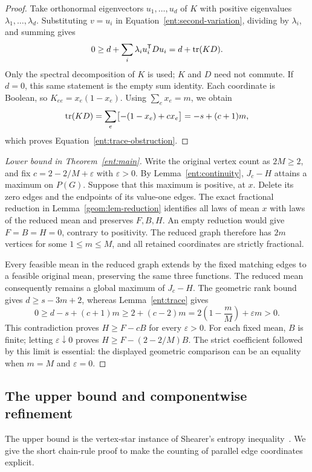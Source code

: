 \begin{proof}
Take orthonormal eigenvectors $u_1,\ldots,u_d$ of $K$ with positive
eigenvalues $\lambda_1,\ldots,\lambda_d$. Substituting $v=u_i$ in
Equation~\eqref{ent:second-variation}, dividing by $\lambda_i$, and
summing gives
\[
             0\ge d+\sum_i\lambda_i u_i^{\mathsf T}Du_i
                    =d+\operatorname{tr}(KD).
\]
Only the spectral decomposition of $K$ is used; $K$ and $D$ need not
commute. If $d=0$, this same statement is the empty sum identity.
Each coordinate is Boolean, so $K_{ee}=x_e(1-x_e)$. Using
$\sum_e x_e=m$, we obtain
\[
 \operatorname{tr}(KD)=\sum_e\bigl[-(1-x_e)+cx_e\bigr]=-s+(c+1)m,
\]
which proves Equation~\eqref{ent:trace-obstruction}.
\end{proof}

\begin{proof}[Lower bound in Theorem~\ref{ent:main}]
Write the original vertex count as $2M\ge2$, and fix
$c=2-2/M+\varepsilon$ with $\varepsilon>0$.
By Lemma~\ref{ent:continuity}, $J_c-H$ attains a maximum on $P(G)$.
Suppose that this maximum is positive, at $x$. Delete its zero edges
and the endpoints of its value-one edges. The exact fractional reduction
in Lemma~\ref{geom:lem-reduction} identifies all laws of mean $x$ with laws
of the reduced mean and preserves $F,B,H$. An empty reduction would give
$F=B=H=0$, contrary to positivity. The reduced graph therefore has
$2m$ vertices for some $1\le m\le M$, and all retained coordinates are
strictly fractional.

Every feasible mean in the reduced graph extends by the fixed matching
edges to a feasible original mean, preserving the same three functions.
The reduced mean consequently remains a global maximum of $J_c-H$.
The geometric rank bound gives $d\ge s-3m+2$, whereas
Lemma~\ref{ent:trace} gives
\[
 0\ge d-s+(c+1)m\ge 2+(c-2)m
       =2\left(1-\frac mM\right)+\varepsilon m>0.
\]
This contradiction proves $H\ge F-cB$ for every $\varepsilon>0$.
For each fixed mean, $B$ is finite; letting $\varepsilon\downarrow0$
proves $H\ge F-(2-2/M)B$. The strict coefficient followed by this limit
is essential: the displayed geometric comparison can be an equality
when $m=M$ and $\varepsilon=0$.
\end{proof}

\subsection{The upper bound and componentwise refinement}

The upper bound is the vertex-star instance of Shearer's entropy
inequality~\citep[Section~V, inequality~(22)]{ChungGrahamFranklShearer1986}.
We give the short chain-rule proof to make the counting of parallel
edge coordinates explicit.

